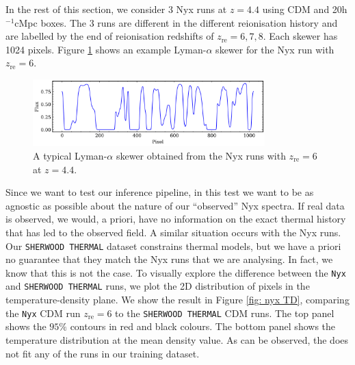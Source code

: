 In the rest of this section, we consider 3 Nyx runs at $z=4.4$ using CDM and 20h$^{-1}$cMpc boxes. The 3 runs are different in the different reionisation history and are labelled by the end of reionisation redshifts of $z_\mathrm{re}=6,7,8$. Each skewer has 1024 pixels. Figure \ref{fig: nyx skewer} shows an example Lyman-$\alpha$ skewer for the Nyx run with $z_\mathrm{re}=6$.


\begin{figure}
    \centering
    \includegraphics[width=0.8\textwidth]{img/ML/nyx_skewer.png}
    \caption{A typical Lyman-$\alpha$ skewer obtained from the Nyx runs with $z_\mathrm{re}=6$ at $z=4.4$.}
    \label{fig: nyx skewer}
\end{figure}
Since we want to test our inference pipeline, in this test we want to be as agnostic as possible about the nature of our ``observed'' Nyx spectra. If real data is observed, we would, a priori, have no information on the exact thermal history that has led to the observed field. A similar situation occurs with the Nyx runs. Our \texttt{SHERWOOD THERMAL} dataset constrains thermal models, but we have a priori no guarantee that they match the Nyx runs that we are analysing. In fact, we know that this is not the case. To visually explore the difference between the \texttt{Nyx} and \texttt{SHERWOOD THERMAL} runs, we plot the 2D distribution of pixels in the temperature-density plane. We show the result in Figure \ref{fig: nyx TD}, comparing the \texttt{Nyx} CDM run $z_\mathrm{re}=6$ to the \texttt{SHERWOOD THERMAL} CDM runs. The top panel shows the $95\%$ contours in red and black colours. The bottom panel shows the temperature distribution at the mean density value. As can be observed, the  does not fit any of the runs in our training dataset.


